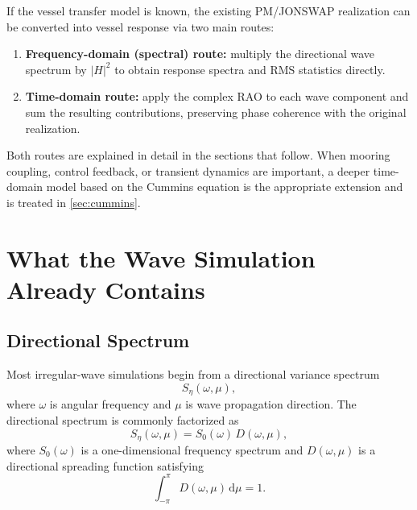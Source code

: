 \documentclass[journal,10pt,twocolumn]{IEEEtran}
\newcommand{\dd}{\,\mathrm{d}}
\begin{document}
    If the vessel transfer model is known, the existing PM/JONSWAP realization can be
    converted into vessel response via two main routes:
    \begin{enumerate}[label=(\roman*),leftmargin=1.4em]
    \item \textbf{Frequency-domain (spectral) route:} multiply the directional wave
    spectrum by $|H|^2$ to obtain response spectra and RMS statistics directly.
    \item \textbf{Time-domain route:} apply the complex RAO to each wave component and
    sum the resulting contributions, preserving phase coherence with the original
    realization.
    \end{enumerate}
    Both routes are explained in detail in the sections that follow.
    When mooring coupling, control feedback, or transient dynamics are important, a
    deeper time-domain model based on the Cummins equation is the appropriate extension and
    is treated in \cref{sec:cummins}.

    \section{What the Wave Simulation Already Contains}
    \label{sec:wavemodel}

    \subsection{Directional Spectrum}
    \label{sec:dirspectrum}

    Most irregular-wave simulations begin from a directional variance spectrum
    \begin{equation}
        S_\eta(\omega,\mu),
    \end{equation}
    where $\omega$ is angular frequency and $\mu$ is wave propagation direction.
    The directional spectrum is commonly factorized as
    \begin{equation}
        S_\eta(\omega,\mu) = S_0(\omega)\,D(\omega,\mu),
        \label{eq:factorized}
    \end{equation}
    where $S_0(\omega)$ is a one-dimensional frequency spectrum and $D(\omega,\mu)$ is a
    directional spreading function satisfying
    \begin{equation}
        \int_{-\pi}^{\pi} D(\omega,\mu)\dd\mu = 1.
    \end{equation}
\end{document}
